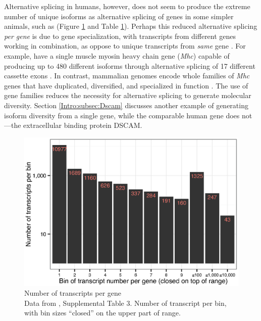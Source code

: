    Alternative splicing in humans, however, does not seem to produce the extreme number of unique isoforms as alternative splicing of genes in some simpler animals, such as \flies{} (Figure \ref{Intro:fig:txPerFlyGene} and Table \ref{Intro:fig:txPerFlyGene}). Perhaps this reduced alternative splicing \textit{per gene} is due to gene specialization, with transcripts from different genes working in combination, as oppose to unique transcripts from \textit{same} gene \citep{Park2007}. For example, \flies{} have a single muscle myosin heavy chain gene (\textit{Mhc}) capable of producing up to 480 different isoforms through alternative splicing of 17 different cassette exons \citep{Bernstein1983a}. In contrast, mammalian genomes encode whole families of \textit{Mhc} genes that have duplicated, diversified, and specialized in function \citep{Weiss1996}. The use of gene families reduces the necessity for alternative splicing to generate molecular diversity. Section \ref{Intro:subsec:Dscam} discusses another example of \flies{} generating isoform diversity from a single gene, while the comparable human gene does not---the extracellular binding protein DSCAM.

    \begin{figure} %
      \centering 
      \includegraphics{Figures/Intro/NumberOFTranscriptsPerFlyGene.eps}
      \caption[Number of transcripts per \flies{} gene]
      {
        Number of transcripts per \flies{} gene\\[0.25cm]
        Data from \citep{Brown2014}, Supplemental Table 3. Number of transcript per bin, with bin sizes ``closed'' on the upper part of range.
        }
      \label{Intro:fig:txPerFlyGene}
      \end{figure}

